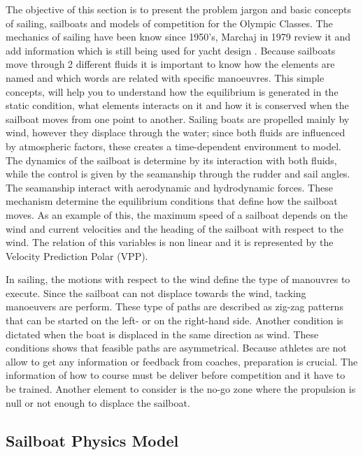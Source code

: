 The objective of this section is to present the problem jargon and basic concepts of sailing, sailboats and models of competition for the Olympic Classes. The mechanics of sailing have been know since 1950's, Marchaj in 1979 review it and add information which is still being used for yacht design \cite{marchajaereo1979}. Because  sailboats move through 2  different fluids it is important to know how the elements are named and which words are related with specific manoeuvres.  This simple concepts, will help you to understand how the equilibrium is generated in the static condition, what elements interacts on it and how it is conserved when the sailboat moves from one point to another. 
Sailing boats are propelled mainly by wind, however they displace through the water; since both fluids are influenced by atmospheric factors, these creates a time-dependent environment to model. The dynamics of the sailboat is determine by its interaction with both fluids, while the control is given by the seamanship through the rudder and sail angles. The seamanship interact with aerodynamic and hydrodynamic forces. These mechanism determine the equilibrium conditions that define how the sailboat moves\cite{fossati2009aero}.  As an example of this, the maximum speed of a sailboat depends on the wind and current velocities and the heading of the sailboat with respect to the wind. The relation of this variables is non linear and it is represented by the Velocity Prediction Polar (VPP).\par
In sailing, the motions with respect to the wind define the type of manouvres to execute.  Since the sailboat can not displace towards the wind, tacking manoeuvers are perform. These type of paths are described as zig-zag patterns that can be started on the left- or on the right-hand side. Another condition is dictated when the boat is displaced in the same direction as wind. These conditions shows that feasible paths are asymmetrical\cite{dolinskaya2012optimal}. Because athletes are not allow to get any information or feedback from coaches, preparation is crucial. The information of how to course must be deliver before competition and it have to be trained. Another element to consider is the no-go zone where the propulsion is null or not enough to displace the sailboat\cite{yang2011control}.\par

\subsection {Sailboat Physics Model} \label{sailphysics}

